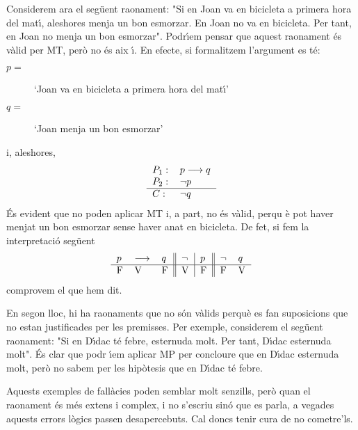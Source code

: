 \bigskip

Considerem ara el seg\"{u}ent raonament: "Si en Joan va en bicicleta a
primera hora del mat\'{\i}, aleshores menja un bon esmorzar. En Joan no va
en bicicleta. Per tant, en Joan no menja un bon esmorzar". Podr\'{\i}em
pensar que aquest raonament \'{e}s v\`{a}lid per MT, per\`{o} no \'{e}s aix%
\'{\i}. En efecte, si formalitzem l'argument es t\'{e}:

\begin{description}
\item[$p=$] `Joan va en bicicleta a primera hora del mat\'{\i}'

\item[$q=$] `Joan menja un bon esmorzar'
\end{description}

i, aleshores,%
\begin{equation*}
\begin{tabular}{ll}
$P_{1}:$ & $p\longrightarrow q$ \\
$P_{2}:$ & $\lnot p$ \\ \hline
$C:$ & $\lnot q$%
\end{tabular}
\end{equation*}
\'{E}s evident que no poden aplicar MT i, a part, no \'{e}s v\`{a}lid, perqu%
\`{e} pot haver menjat un bon esmorzar sense haver anat en bicicleta. De
fet, si fem la interpretaci\'{o} seg\"{u}ent%
\begin{equation*}
\begin{tabular}{lll||l|l||ll}
$p$ & $\longrightarrow$ & $q$ & $\lnot$ & $p$ & $\lnot$ & $q$ \\ \hline
F & V & F & V & F & F & V%
\end{tabular}
\end{equation*}
comprovem el que hem dit.

\bigskip

En segon lloc, hi ha raonaments que no s\'{o}n v\`{a}lids perqu\`{e} es fan
suposicions que no estan justificades per les premisses. Per exemple,
considerem el seg\"{u}ent raonament: "Si en D\'{\i}dac t\'{e} febre,
esternuda molt. Per tant, D\'{\i}dac esternuda molt". \'{E}s clar que podr%
\'{\i}em aplicar MP per concloure que en D\'{\i}dac esternuda molt, per\`{o}
no sabem per les hip\`{o}tesis que en D\'{\i}dac t\'{e} febre.

Aquests exemples de fal\textperiodcentered l\`{a}cies poden semblar molt
senzills, per\`{o} quan el raonament \'{e}s m\'{e}s extens i complex, i no
s'escriu sin\'{o} que es parla, a vegades aquests errors l\`{o}gics passen
desapercebuts. Cal doncs tenir cura de no cometre'ls.

